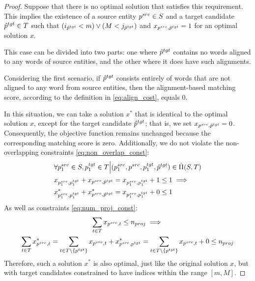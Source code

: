 \begin{proof}
  Suppose that there is no optimal solution that satisfies this requirement.
  This implies the existence of a source entity \( p^{src} \in S \) and a target
  candidate \( \hat{p}^{tgt} \in T \) such that \( (i_{\hat{p}^{tgt}} < m) \lor (M < j_{\hat{p}^{tgt}}) \)
  and \( x_{p^{src}, \hat{p}^{tgt}} = 1 \) for an optimal solution \( x \).

  This case can be divided into two parts: one where \( \hat{p}^{tgt} \) contains
  no words aligned to any words of source entities, and the other where it
  does have such alignments.

  Considering the first scenario, if \( \hat{p}^{tgt} \) consists entirely of
  words that are not aligned to any word from source entities, then the
  alignment-based matching score, according to the definition in \eqref{eq:align_cost},
  equals \( 0 \).

  In this situation, we can take a solution \( x^* \) that is identical to the
  optimal solution \( x \), except for the target candidate \( \hat{p}^{tgt} \);
  that is, we set \( x_{p^{src}, \hat{p}^{tgt}} = 0 \). Consequently, the objective
  function remains unchanged because the corresponding matching score is zero. Additionally,
  we do not violate the non-overlapping constraints \eqref{eq:non_overlap_const}:
  \begin{align*}
    & \forall p_1^{src} \in S, p_1^{tgt} \in T \Big| (p_1^{src}, p^{src}, p_1^{tgt}, \hat{p}^{tgt}) \in \hat{\Pi}(S, T) \\
    & x_{p_1^{src}, p_1^{tgt}} + x_{p^{src}, \hat{p}^{tgt}} =
    x_{p_1^{src}, p_1^{tgt}} + 1 \leq 1 \implies                                                                         \\
    & x^*_{p_1^{src}, p_1^{tgt}} + x^*_{p^{src}, \hat{p}^{tgt}} =
    x_{p_1^{src}, p_1^{tgt}} + 0 \leq 1
  \end{align*}
  As well as constraints \eqref{eq:num_proj_const}:
  \begin{multline*}
    \sum\limits_{t \in T} x_{p^{src}, t} \leq n_{proj} \implies                             \\
    \sum\limits_{t \in T} x^*_{p^{src}, t} =
    \sum\limits_{t \in T \setminus \{ p^{tgt} \}} x_{p^{src}, t} + x^*_{p^{src}, p^{tgt}} =
    \sum\limits_{t \in T \setminus \{ p^{tgt} \}} x_{p^{src}, t} + 0 \leq n_{proj}
  \end{multline*}
  Therefore, such a solution \( x^* \) is also optimal, just like the original solution \( x \),
  but with target candidates constrained to have indices within the range \( [m, M] \).


\end{proof}
